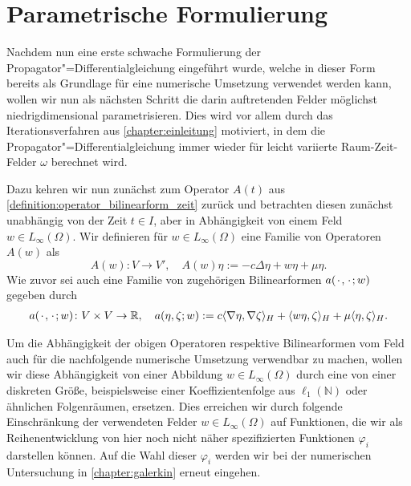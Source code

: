 \documentclass[../main.tex]{subfiles}
\begin{document}


\section{Parametrische Formulierung} %
\label{section:parametrische_formulierung}

Nachdem nun eine erste schwache Formulierung der Propagator"=Differentialgleichung eingeführt wurde, welche in dieser Form bereits als Grundlage für eine numerische Umsetzung verwendet werden kann, wollen wir nun als nächsten Schritt die darin auftretenden Felder möglichst niedrigdimensional parametrisieren.
Dies wird vor allem durch das Iterationsverfahren aus \cref{chapter:einleitung} motiviert, in dem die Propagator"=Differentialgleichung immer wieder für leicht variierte Raum-Zeit-Felder $\omega$ berechnet wird.

Dazu kehren wir nun zunächst zum Operator $A(t)$ aus \cref{definition:operator_bilinearform_zeit} zurück und betrachten diesen zunächst unabhängig von der Zeit $t \in I$, aber in Abhängigkeit von einem Feld $w \in L_{\infty}(\Omega)$.
Wir definieren für $w \in L_{\infty}(\Omega)$ eine Familie von Operatoren $A(w)$ als
\begin{equation}
    \label{eq:operator_feld}
    A(w) \colon V \to V', \quad A(w) \eta := - c \Delta \eta + w \eta + \mu \eta.
\end{equation}
Wie zuvor sei auch eine Familie von zugehörigen Bilinearformen $a({\mkern2mu\cdot\mkern2mu}, {\mkern2mu\cdot\mkern2mu}; w)$ gegeben durch
\begin{equation}
    \label{eq:bilinearform_feld}
    \begin{aligned}
        a({\mkern2mu\cdot\mkern2mu}, {\mkern2mu\cdot\mkern2mu}; w) \colon V \times V \to \mathbb{R}, \quad
        a(\eta, \zeta; w) := c\langle\nabla \eta,\nabla \zeta\rangle_{H} + \langle w \eta,\zeta\rangle_{H} + \mu \langle\eta,\zeta\rangle_{H}.
    \end{aligned}
\end{equation}

Um die Abhängigkeit der obigen Operatoren respektive Bilinearformen vom Feld auch für die nachfolgende numerische Umsetzung verwendbar zu machen, wollen wir diese Abhängigkeit von einer Abbildung $w \in L_{\infty}(\Omega)$ durch eine von einer diskreten Größe, beispielsweise einer Koeffizientenfolge aus $\ell_{1}(\mathbb{N})$ oder ähnlichen Folgenräumen, ersetzen.
Dies erreichen wir durch folgende Einschränkung der verwendeten Felder $w \in L_{\infty}(\Omega)$ auf Funktionen, die wir als Reihenentwicklung von hier noch nicht näher spezifizierten Funktionen $\varphi_{i}$ darstellen können.
Auf die Wahl dieser $\varphi_{i}$ werden wir bei der numerischen Untersuchung in \cref{chapter:galerkin} erneut eingehen.
\end{document}
